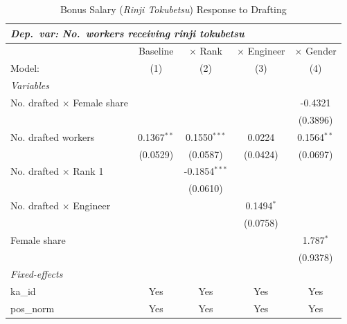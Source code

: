 \begin{table}[htbp]
\centering
\caption{Bonus Salary (\emph{Rinji Tokubetsu}) Response to Drafting}
\label{tab:rinji}
\begin{threeparttable}
\begin{tabular}{lcccc}
   \multicolumn{5}{l}{\textit{Dep.\ var: No.\ workers receiving \emph{rinji tokubetsu}}} \\[4pt]
   \midrule \midrule
                                      & Baseline      & $\times$ Rank   & $\times$ Engineer  & $\times$ Gender \\    
   Model:                             & (1)           & (2)             & (3)                & (4)\\  
   \midrule
   \emph{Variables}\\
   No. drafted $\times$ Female share  &               &                 &                    & -0.4321\\   
                                      &               &                 &                    & (0.3896)\\   
   No. drafted workers                & 0.1367$^{**}$ & 0.1550$^{***}$  & 0.0224             & 0.1564$^{**}$\\   
                                      & (0.0529)      & (0.0587)        & (0.0424)           & (0.0697)\\   
   No. drafted $\times$ Rank 1        &               & -0.1854$^{***}$ &                    &   \\   
                                      &               & (0.0610)        &                    &   \\   
   No. drafted $\times$ Engineer      &               &                 & 0.1494$^{*}$       &   \\   
                                      &               &                 & (0.0758)           &   \\   
   Female share                       &               &                 &                    & 1.787$^{*}$\\   
                                      &               &                 &                    & (0.9378)\\   
   \midrule
   \emph{Fixed-effects}\\
   ka\_id                             & Yes           & Yes             & Yes                & Yes\\  
   pos\_norm                          & Yes           & Yes             & Yes                & Yes\\  

\end{tabular}
\end{threeparttable}
\end{table}
